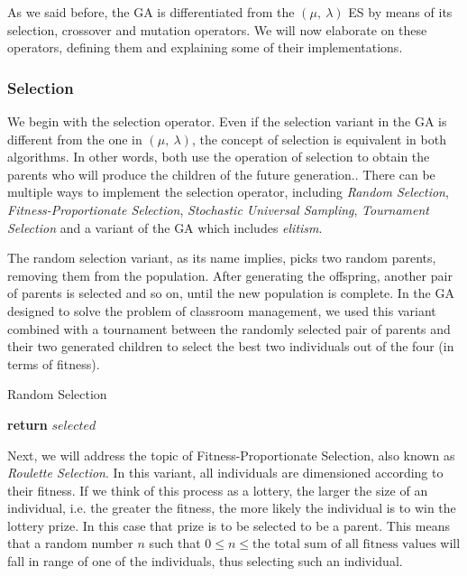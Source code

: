 As we said before, the GA is differentiated from the $(\mu,\ \lambda)$ ES by means of its selection, crossover and mutation operators. We will now elaborate on these operators, defining them and explaining some of their implementations.

\subsubsection{Selection}

We begin with the selection operator. Even if the selection variant in the GA is different from the one in $(\mu,\ \lambda)$, the concept of selection is equivalent in both algorithms. In other words, both use the operation of selection to obtain the parents who will produce the children of the future generation.. There can be multiple ways to implement the selection operator, including \textit{Random Selection}, \textit{Fitness-Proportionate Selection}, \textit{Stochastic Universal Sampling}, \textit{Tournament Selection} and a variant of the GA which includes \textit{elitism}.

The random selection variant, as its name implies, picks two random parents, removing them from the population. After generating the offspring, another pair of parents is selected and so on, until the new population is complete. In the GA designed to solve the problem of classroom management, we used this variant combined with a tournament between the randomly selected pair of parents and their two generated children to select the best two individuals out of the four (in terms of fitness).

\begin{algorithm}[H]
    \caption{Random Selection}
    \begin{algorithmic}[1]
             
            \State \textbf{return} $selected$
        \EndProcedure
    \end{algorithmic}
\end{algorithm}

Next, we will address the topic of Fitness-Proportionate Selection, also known as \textit{Roulette Selection}. In this variant, all individuals are dimensioned according to their fitness. If we think of this process as a lottery, the larger the size of an individual, i.e. the greater the fitness, the more likely the individual is to win the lottery prize. In this case that prize is to be selected to be a parent. This means that a random number $n$ such that $0 \leq n \leq \text{the total sum of all fitness values}$ will fall in range of one of the individuals, thus selecting such an individual.

